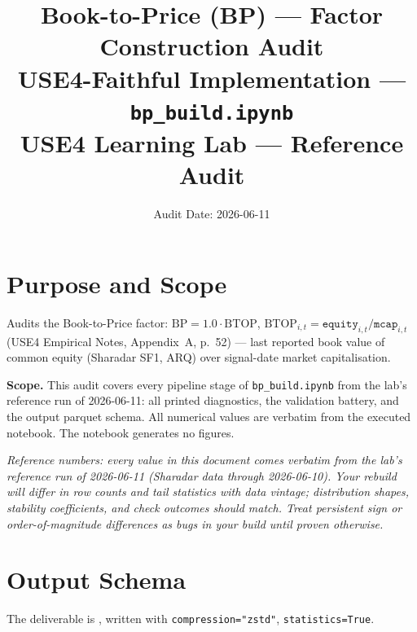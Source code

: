 \documentclass[11pt,a4paper]{article}
\title{\textbf{Book-to-Price (BP) --- Factor Construction Audit}\\[2pt]
\large USE4-Faithful Implementation --- \texttt{bp\_build.ipynb}\\[4pt]
\normalsize USE4 Learning Lab --- Reference Audit}
\author{Audit Date: 2026-06-11}
\date{}
\newcommand{\NOTE}[1]{\textcolor{note}{\textit{#1}}}
\begin{document}
\maketitle
\tableofcontents
\newpage

\section{Purpose and Scope}

Audits the Book-to-Price factor: $\mathrm{BP} = 1.0 \cdot \mathrm{BTOP}$,
$\mathrm{BTOP}_{i,t} = \texttt{equity}_{i,t} / \texttt{mcap}_{i,t}$ (USE4 Empirical
Notes, Appendix~A, p.~52) --- last reported book value of common equity (Sharadar
SF1, ARQ) over signal-date market capitalisation.

\smallskip
\textbf{Scope.} This audit covers every pipeline stage of
\texttt{bp\_build.ipynb} from the lab's reference run of 2026-06-11: all printed diagnostics, the
validation battery, and the output parquet schema. All numerical values are
verbatim from the executed notebook. The notebook generates no figures.

\NOTE{Reference numbers: every value in this document comes verbatim from the lab's reference run of 2026-06-11 (Sharadar data through 2026-06-10). Your rebuild will differ in row counts and tail statistics with data vintage; distribution shapes, stability coefficients, and check outcomes should match. Treat persistent sign or order-of-magnitude differences as bugs in your build until proven otherwise.}


\section{Output Schema}

The deliverable is , written with
\texttt{compression="zstd"}, \newline\texttt{statistics=True}.
\end{document}

